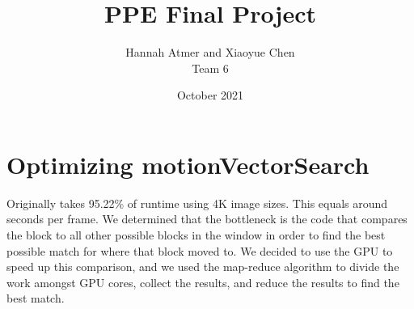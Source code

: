 \documentclass{article}
\title{PPE Final Project}
\author{Hannah Atmer and Xiaoyue Chen \\ Team 6}
\date{October 2021}
\begin{document}
\maketitle

\section{Optimizing motionVectorSearch}

Originally takes 95.22\% of runtime using 4K image sizes. This equals around  seconds per frame.
We determined that the bottleneck is the code that compares the block to all other possible blocks in the window in order to find the best possible match for where that block moved to.
We decided to use the GPU to speed up this comparison, and we used the map-reduce algorithm to divide the work amongst GPU cores, collect the results, and reduce the results to find the best match.
\end{document}
